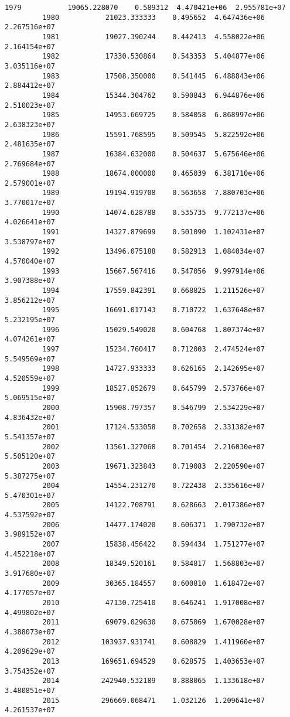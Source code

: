 \documentclass[11pt]{article}
\begin{document}
\begin{Verbatim}[commandchars=\\\{\}]
         1979           19065.228070    0.589312  4.470421e+06  2.955781e+07   
         1980           21023.333333    0.495652  4.647436e+06  2.267516e+07   
         1981           19027.390244    0.442413  4.558022e+06  2.164154e+07   
         1982           17330.530864    0.543353  5.404877e+06  3.035116e+07   
         1983           17508.350000    0.541445  6.488843e+06  2.884412e+07   
         1984           15344.304762    0.590843  6.944876e+06  2.510023e+07   
         1985           14953.669725    0.584058  6.868997e+06  2.638323e+07   
         1986           15591.768595    0.509545  5.822592e+06  2.481635e+07   
         1987           16384.632000    0.504637  5.675646e+06  2.769684e+07   
         1988           18674.000000    0.465039  6.381710e+06  2.579001e+07   
         1989           19194.919708    0.563658  7.880703e+06  3.770017e+07   
         1990           14074.628788    0.535735  9.772137e+06  4.026641e+07   
         1991           14327.879699    0.501090  1.102431e+07  3.538797e+07   
         1992           13496.075188    0.582913  1.084034e+07  4.570040e+07   
         1993           15667.567416    0.547056  9.997914e+06  3.907388e+07   
         1994           17559.842391    0.668825  1.211526e+07  3.856212e+07   
         1995           16691.017143    0.710722  1.637648e+07  5.232195e+07   
         1996           15029.549020    0.604768  1.807374e+07  4.074261e+07   
         1997           15234.760417    0.712003  2.474524e+07  5.549569e+07   
         1998           14727.933333    0.626165  2.142695e+07  4.520559e+07   
         1999           18527.852679    0.645799  2.573766e+07  5.069515e+07   
         2000           15908.797357    0.546799  2.534229e+07  4.836432e+07   
         2001           17124.533058    0.702658  2.331382e+07  5.541357e+07   
         2002           13561.327068    0.701454  2.216030e+07  5.505120e+07   
         2003           19671.323843    0.719083  2.220590e+07  5.387275e+07   
         2004           14554.231270    0.722438  2.335616e+07  5.470301e+07   
         2005           14122.708791    0.628663  2.017386e+07  4.537592e+07   
         2006           14477.174020    0.606371  1.790732e+07  3.989152e+07   
         2007           15838.456422    0.594434  1.751277e+07  4.452218e+07   
         2008           18349.520161    0.584817  1.568803e+07  3.917680e+07   
         2009           30365.184557    0.600810  1.618472e+07  4.177057e+07   
         2010           47130.725410    0.646241  1.917008e+07  4.499802e+07   
         2011           69079.029630    0.675069  1.670028e+07  4.388073e+07   
         2012          103937.931741    0.608829  1.411960e+07  4.209629e+07   
         2013          169651.694529    0.628575  1.403653e+07  3.754352e+07   
         2014          242940.532189    0.888065  1.133618e+07  3.480851e+07   
         2015          296669.068471    1.032126  1.209641e+07  4.261537e+07   
         

\end{Verbatim}
\end{document}
